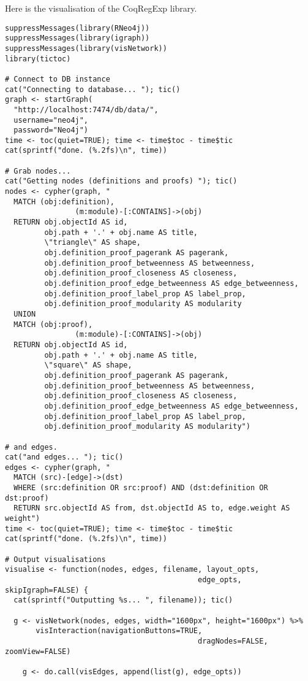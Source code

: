 Here is the visualisation of the CoqRegExp library.

\begin{verbatim}
suppressMessages(library(RNeo4j))
suppressMessages(library(igraph))
suppressMessages(library(visNetwork))
library(tictoc)

# Connect to DB instance
cat("Connecting to database... "); tic()
graph <- startGraph(
  "http://localhost:7474/db/data/",
  username="neo4j",
  password="Neo4j")
time <- toc(quiet=TRUE); time <- time$toc - time$tic
cat(sprintf("done. (%.2fs)\n", time))

# Grab nodes...
cat("Getting nodes (definitions and proofs) "); tic()
nodes <- cypher(graph, "
  MATCH (obj:definition),
				(m:module)-[:CONTAINS]->(obj)
  RETURN obj.objectId AS id,
         obj.path + '.' + obj.name AS title,
         \"triangle\" AS shape,
         obj.definition_proof_pagerank AS pagerank,
         obj.definition_proof_betweenness AS betweenness,
         obj.definition_proof_closeness AS closeness,
         obj.definition_proof_edge_betweenness AS edge_betweenness,
         obj.definition_proof_label_prop AS label_prop,
         obj.definition_proof_modularity AS modularity
  UNION
  MATCH (obj:proof),
				(m:module)-[:CONTAINS]->(obj)
  RETURN obj.objectId AS id,
         obj.path + '.' + obj.name AS title,
         \"square\" AS shape,
         obj.definition_proof_pagerank AS pagerank,
         obj.definition_proof_betweenness AS betweenness,
         obj.definition_proof_closeness AS closeness,
         obj.definition_proof_edge_betweenness AS edge_betweenness,
         obj.definition_proof_label_prop AS label_prop,
         obj.definition_proof_modularity AS modularity")

# and edges.
cat("and edges... "); tic()
edges <- cypher(graph, "
  MATCH (src)-[edge]->(dst)
  WHERE (src:definition OR src:proof) AND (dst:definition OR dst:proof)
  RETURN src.objectId AS from, dst.objectId AS to, edge.weight AS weight")
time <- toc(quiet=TRUE); time <- time$toc - time$tic
cat(sprintf("done. (%.2fs)\n", time))

# Output visualisations
visualise <- function(nodes, edges, filename, layout_opts,
											edge_opts, skipIgraph=FALSE) {
  cat(sprintf("Outputting %s... ", filename)); tic()

  g <- visNetwork(nodes, edges, width="1600px", height="1600px") %>%
       visInteraction(navigationButtons=TRUE,
											dragNodes=FALSE, zoomView=FALSE)

	g <- do.call(visEdges, append(list(g), edge_opts))


\end{verbatim}
